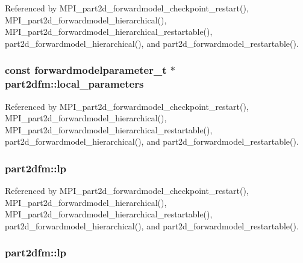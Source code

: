Referenced by M\+P\+I\+\_\+part2d\+\_\+forwardmodel\+\_\+checkpoint\+\_\+restart(), M\+P\+I\+\_\+part2d\+\_\+forwardmodel\+\_\+hierarchical(), M\+P\+I\+\_\+part2d\+\_\+forwardmodel\+\_\+hierarchical\+\_\+restartable(), part2d\+\_\+forwardmodel\+\_\+hierarchical(), and part2d\+\_\+forwardmodel\+\_\+restartable().

\subsubsection[{\texorpdfstring{local\+\_\+parameters}{local_parameters}}]{\setlength{\rightskip}{0pt plus 5cm}const {\bf forwardmodelparameter\+\_\+t} $\ast$ part2dfm\+::local\+\_\+parameters}\hypertarget{structpart2dfm_a74ce0287c6c2cea1fb4b4e8bf310392f}{}\label{structpart2dfm_a74ce0287c6c2cea1fb4b4e8bf310392f}


Referenced by M\+P\+I\+\_\+part2d\+\_\+forwardmodel\+\_\+checkpoint\+\_\+restart(), M\+P\+I\+\_\+part2d\+\_\+forwardmodel\+\_\+hierarchical(), M\+P\+I\+\_\+part2d\+\_\+forwardmodel\+\_\+hierarchical\+\_\+restartable(), part2d\+\_\+forwardmodel\+\_\+hierarchical(), and part2d\+\_\+forwardmodel\+\_\+restartable().

\subsubsection[{\texorpdfstring{lp}{lp}}]{ part2dfm\+::lp}\hypertarget{structpart2dfm_a01e70c10872c02060c6d947d7e018be3}{}\label{structpart2dfm_a01e70c10872c02060c6d947d7e018be3}


Referenced by M\+P\+I\+\_\+part2d\+\_\+forwardmodel\+\_\+checkpoint\+\_\+restart(), M\+P\+I\+\_\+part2d\+\_\+forwardmodel\+\_\+hierarchical(), M\+P\+I\+\_\+part2d\+\_\+forwardmodel\+\_\+hierarchical\+\_\+restartable(), part2d\+\_\+forwardmodel\+\_\+hierarchical(), and part2d\+\_\+forwardmodel\+\_\+restartable().

\subsubsection[{\texorpdfstring{lp}{lp}}]{ part2dfm\+::lp}\hypertarget{structpart2dfm_a6c9bb5290acb91254fa96c4350d81076}{}\label{structpart2dfm_a6c9bb5290acb91254fa96c4350d81076}
